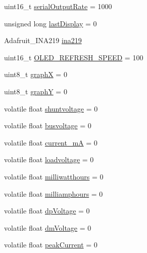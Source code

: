 \begin{DoxyCompactItemize}
\item 
uint16\+\_\+t \hyperlink{_u_s_b___tester___o_l_e_d__128x64___beta__2_82_8ino_a60d0942dfec6a321b3e4ba97ff26e435}{serial\+Output\+Rate} = 1000
\item 
unsigned long \hyperlink{_u_s_b___tester___o_l_e_d__128x64___beta__2_82_8ino_acbb60cd84cf03900f879f85f14c84f1f}{last\+Display} = 0
\item 
Adafruit\+\_\+\+I\+N\+A219 \hyperlink{_u_s_b___tester___o_l_e_d__128x64___beta__2_82_8ino_a69393b86406e49dbacfbabd283877495}{ina219}
\item 
uint16\+\_\+t \hyperlink{_u_s_b___tester___o_l_e_d__128x64___beta__2_82_8ino_ad9c13fad79a4362c2e30aa0a1960783c}{O\+L\+E\+D\+\_\+\+R\+E\+F\+R\+E\+S\+H\+\_\+\+S\+P\+E\+ED} = 100
\item 
uint8\+\_\+t \hyperlink{_u_s_b___tester___o_l_e_d__128x64___beta__2_82_8ino_a8ab96d9600d77bbd380a380710fc55e5}{graphX} = 0
\item 
uint8\+\_\+t \hyperlink{_u_s_b___tester___o_l_e_d__128x64___beta__2_82_8ino_a6f07760869e72b538a7d363728490a8f}{graphY} = 0
\item 
volatile float \hyperlink{_u_s_b___tester___o_l_e_d__128x64___beta__2_82_8ino_a7e77822a41f54af0949a88e65478ead6}{shuntvoltage} = 0
\item 
volatile float \hyperlink{_u_s_b___tester___o_l_e_d__128x64___beta__2_82_8ino_ab31c274cfccca6db613d5fed1dd6ad98}{busvoltage} = 0
\item 
volatile float \hyperlink{_u_s_b___tester___o_l_e_d__128x64___beta__2_82_8ino_a32c98e5d32269e62d3c55eaf0cf3b3a9}{current\+\_\+mA} = 0
\item 
volatile float \hyperlink{_u_s_b___tester___o_l_e_d__128x64___beta__2_82_8ino_a78ad8a744148e80f180ead735bc3c587}{loadvoltage} = 0
\item 
volatile float \hyperlink{_u_s_b___tester___o_l_e_d__128x64___beta__2_82_8ino_a239189c63a2236f073cd42e440f28096}{milliwatthours} = 0
\item 
volatile float \hyperlink{_u_s_b___tester___o_l_e_d__128x64___beta__2_82_8ino_a839ec5541d0e05c574b9110a3439d6ea}{milliamphours} = 0
\item 
volatile float \hyperlink{_u_s_b___tester___o_l_e_d__128x64___beta__2_82_8ino_a730448cffde198ed616ce14126c011e6}{dp\+Voltage} = 0
\item 
volatile float \hyperlink{_u_s_b___tester___o_l_e_d__128x64___beta__2_82_8ino_ac87bacf5873c76f97ce248c53c7e8c2e}{dm\+Voltage} = 0
\item 
volatile float \hyperlink{_u_s_b___tester___o_l_e_d__128x64___beta__2_82_8ino_a45c42625d97a9d4be41f965361b6d7f3}{peak\+Current} = 0

\end{DoxyCompactItemize}
